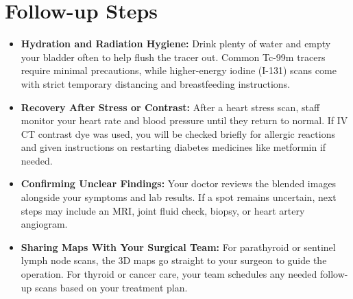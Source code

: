 \section{Follow-up Steps}
\begin{itemize}
    \item \textbf{Hydration and Radiation Hygiene:} Drink plenty of water and empty your bladder often to help flush the tracer out. Common Tc-99m tracers require minimal precautions, while higher-energy iodine (I-131) scans come with strict temporary distancing and breastfeeding instructions.
    \item \textbf{Recovery After Stress or Contrast:} After a heart stress scan, staff monitor your heart rate and blood pressure until they return to normal. If IV CT contrast dye was used, you will be checked briefly for allergic reactions and given instructions on restarting diabetes medicines like metformin if needed.
    \item \textbf{Confirming Unclear Findings:} Your doctor reviews the blended images alongside your symptoms and lab results. If a spot remains uncertain, next steps may include an MRI, joint fluid check, biopsy, or heart artery angiogram.
    \item \textbf{Sharing Maps With Your Surgical Team:} For parathyroid or sentinel lymph node scans, the 3D maps go straight to your surgeon to guide the operation. For thyroid or cancer care, your team schedules any needed follow-up scans based on your treatment plan.
\end{itemize}

